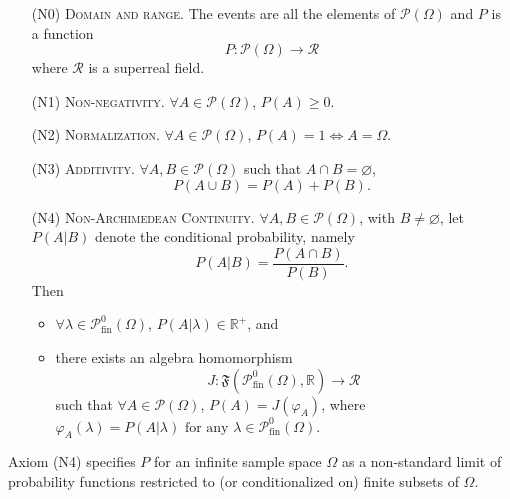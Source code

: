 \begin{itemize}
\item[(N0)] \textsc{Domain and range.} The events are all the elements of $\mathcal{P}\left( \Omega \right)$ and $P$ is a function
$$
P:\mathcal{P}\left( \Omega \right) \rightarrow \mathcal{R}
$$
where $\mathcal{R}$ is a superreal field.
\item[(N1)] \textsc{Non-negativity.} $\forall A\in \mathcal{P}\left( \Omega \right)$, $P(A)\geq 0$.
\item[(N2)] \textsc{Normalization.} $\forall A\in \mathcal{P}\left( \Omega \right)$, $P(A)=1\Leftrightarrow A=\Omega.$
\item[(N3)] \textsc{Additivity.} $\forall A, B\in \mathcal{P}\left( \Omega \right)$ such that $A\cap B=\varnothing$, $$P(A\cup B)=P(A)+P(B).$$
\item[(N4)] \textsc{Non-Archimedean Continuity.} $\forall A, B\in \mathcal{P}\left( \Omega \right)$, with $B\neq \varnothing$, let $P(A|B)$ denote the conditional probability, namely
\begin{equation*}
P(A|B)=\frac{P(A\cap B)}{P(B)}.
\end{equation*}
Then
  \begin{itemize}
  \item $\forall \lambda \in \mathcal{P}_{\textrm{fin}}^0(\Omega)$, $P(A|\lambda )\in \mathbb{R^+}$, and
  \item there exists an algebra homomorphism
  $$ J:\mathfrak{F}\left( \mathcal{P}_{\textrm{fin}}^0(\Omega ),\mathbb{R}\right) \rightarrow \mathcal{R} $$
  such that $\forall A\in \mathcal{P}(\Omega )$, $ P(A)=J\left( \varphi _{A}\right)$,
  where $ \varphi _{A}(\lambda )=P(A|\lambda ) \textrm{ for any } \lambda \in \mathcal{P}_{\textrm{fin}}^0(\Omega)$.
  \end{itemize}
\end{itemize}
Axiom (N4) specifies $P$ for an infinite sample space $\Omega$ as a non-standard limit of probability functions restricted to (or conditionalized on) finite subsets of $\Omega$.

